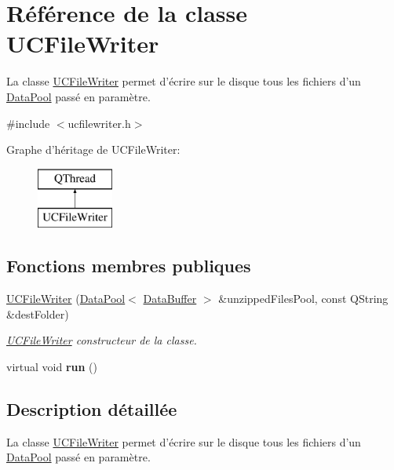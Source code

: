 \hypertarget{class_u_c_file_writer}{\section{Référence de la classe U\+C\+File\+Writer}
\label{class_u_c_file_writer}
}


La classe \hyperlink{class_u_c_file_writer}{U\+C\+File\+Writer} permet d'écrire sur le disque tous les fichiers d'un \hyperlink{class_data_pool}{Data\+Pool} passé en paramètre.  




{\ttfamily \#include $<$ucfilewriter.\+h$>$}

Graphe d'héritage de U\+C\+File\+Writer\+:\begin{figure}[H]
\begin{center}
\leavevmode
\includegraphics[height=2.000000cm]{class_u_c_file_writer}
\end{center}
\end{figure}
\subsection*{Fonctions membres publiques}
\begin{DoxyCompactItemize}
\item 
\hyperlink{class_u_c_file_writer_a5a3d8600c1b5b5063500021fe9df15b3}{U\+C\+File\+Writer} (\hyperlink{class_data_pool}{Data\+Pool}$<$ \hyperlink{class_data_buffer}{Data\+Buffer} $>$ \&unzipped\+Files\+Pool, const Q\+String \&dest\+Folder)
\begin{DoxyCompactList}\small\item\em \hyperlink{class_u_c_file_writer}{U\+C\+File\+Writer} constructeur de la classe. \end{DoxyCompactList}\item 
\hypertarget{class_u_c_file_writer_a707cdd9f57aef4df03fd3e82a5820836}{virtual void {\bfseries run} ()}\label{class_u_c_file_writer_a707cdd9f57aef4df03fd3e82a5820836}

\end{DoxyCompactItemize}


\subsection{Description détaillée}
La classe \hyperlink{class_u_c_file_writer}{U\+C\+File\+Writer} permet d'écrire sur le disque tous les fichiers d'un \hyperlink{class_data_pool}{Data\+Pool} passé en paramètre. 

